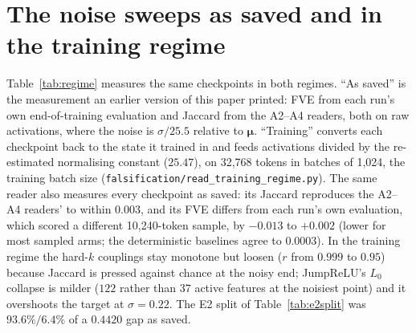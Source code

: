 \documentclass[11pt]{article}
\begin{document}
\section{The noise sweeps as saved and in the training regime}
\label{app:regime}

Table~\ref{tab:regime} measures the same checkpoints in both regimes. ``As
saved'' is the measurement an earlier version of this paper printed: FVE from
each run's own end-of-training evaluation and Jaccard from the A2--A4 readers,
both on raw activations, where the noise is $\sigma/25.5$ relative to
$\boldsymbol{\mu}$. ``Training'' converts each checkpoint back to the state it
trained in and feeds activations divided by the re-estimated normalising
constant ($25.47$), on 32{,}768 tokens in batches of 1{,}024, the training
batch size (\texttt{falsification/read\_training\_regime.py}). The same
reader also measures every checkpoint as saved: its Jaccard reproduces the
A2--A4 readers' to within $0.003$, and its FVE differs from each run's own
evaluation, which scored a different 10{,}240-token sample, by $-0.013$ to
$+0.002$ (lower for most sampled arms; the deterministic baselines agree to
$0.0003$). In the training regime the hard-$k$
couplings stay monotone but loosen ($r$ from $0.999$ to $0.95$) because
Jaccard is pressed against chance at the noisy end; JumpReLU's $L_0$ collapse
is milder ($122$ rather than $37$ active features at the noisiest point) and
it overshoots the target at $\sigma=0.22$. The E2 split of
Table~\ref{tab:e2split} was $93.6\%/6.4\%$ of a $0.4420$ gap as saved.
\end{document}
